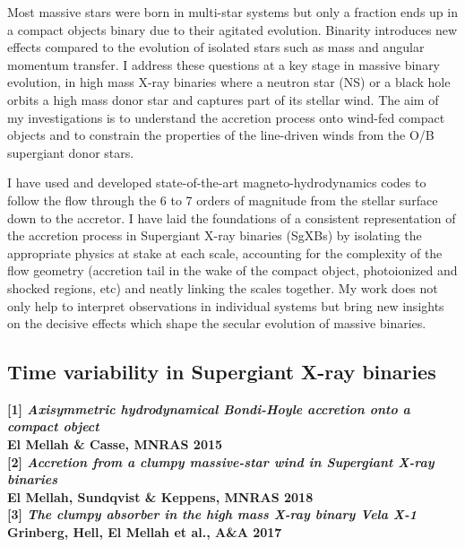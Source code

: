 \documentclass[letterpaper,12pt,onecolumn]{article}
\makeatletter
\newcommand{\sgx}{SgXB\xspace}
\newcommand{\sgxs}{SgXBs\xspace}
\newcommand*{\ns}{NS\@\xspace}
\makeatother
\begin{document}
Most massive stars were born in multi-star systems but only a fraction ends up in a compact objects binary due to their agitated evolution. Binarity introduces new effects compared to the evolution of isolated stars such as mass and angular momentum transfer. I address these questions at a key stage in massive binary evolution, in high mass X-ray binaries where a neutron star (\ns) or a black hole orbits a high mass donor star and captures part of its stellar wind. The aim of my investigations is to understand the accretion process onto wind-fed compact objects and to constrain the properties of the line-driven winds from the O/B supergiant donor stars.

I have used and developed state-of-the-art magneto-hydrodynamics codes to follow the flow through the 6 to 7 orders of magnitude from the stellar surface down to the accretor. I have laid the foundations of a consistent representation of the accretion process in Supergiant X-ray binaries (\sgxs) by isolating the appropriate physics at stake at each scale, accounting for the complexity of the flow geometry (accretion tail in the wake of the compact object, photoionized and shocked regions, etc) and neatly linking the scales together. My work does not only help to interpret observations in individual systems but bring new insights on the decisive effects which shape the secular evolution of massive binaries.


\subsection*{Time variability in Supergiant X-ray binaries}

\footnotesize
\textbf{[1] \textit{Axisymmetric hydrodynamical Bondi-Hoyle accretion onto a compact object}}\\
\hspace*{16pt}\textbf{El Mellah \& Casse, MNRAS 2015}\\
\textbf{[2] \textit{Accretion from a clumpy massive-star wind in Supergiant X-ray binaries}}\\
\hspace*{16pt}\textbf{El Mellah, Sundqvist \& Keppens, MNRAS 2018}\\
\textbf{[3] \textit{The clumpy absorber in the high mass X-ray binary Vela X-1}}\\
\hspace*{16pt}\textbf{Grinberg, Hell, El Mellah et al., A\&A 2017}\\
\end{document}
